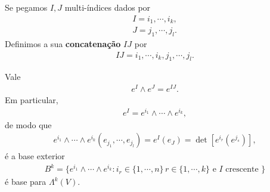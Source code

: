 \begin{definition}[Concatenação]
  Se pegamos $I,J$ multi-índices dados por
  \begin{align*}
    I=i_1,\cdots,i_k,\\
    J=j_1,\cdots,j_l.
  \end{align*}
  Definimos a sua \textbf{concatenação} $IJ$ por
  \begin{align*}
    IJ=i_1,\cdots,i_k,j_1,\cdots,j_l.
  \end{align*}
\end{definition}
\begin{proposition}
  Vale
  \begin{align*}
    e^{I}\wedge e^{J}=e^{IJ}.
  \end{align*}
  Em particular,
  \begin{align*}
    e^{I}=e^{i_1}\wedge\cdots\wedge e^{i_k},
  \end{align*}
  de modo que
  \begin{align*}
    e^{i_1}\wedge\cdots\wedge e^{i_k}(e_{j_1},\cdots,e_{j_l})=e^{I}(e_J)=\det\left[ e^{i_r}(e^{j_s}) \right],
  \end{align*}
  é a base exterior
  \begin{align*}
    B^{k}=\{e^{i_1}\wedge\cdots\wedge e^{i_k}:i_{r}\in\{1,\cdots,n\}\, r\in\{1,\cdots,k\}\text{ e $I$ crescente }\}
  \end{align*}
  é base para $\Lambda^{k}(V)$.
\end{proposition}
